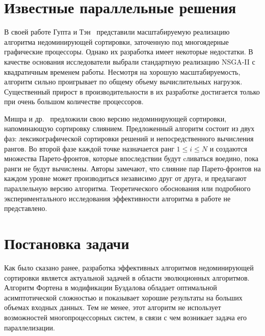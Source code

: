 

\section{Известные параллельные решения}
В своей работе Гупта и Тэн~\cite{gupta15} представили масштабируемую реализацию алгоритма недоминирующей сортировки, заточенную под многоядерные графические процессоры.
Однако их разработка имеет некоторые недостатки. В качестве основания исследователи выбрали стандартную реализацию NSGA-II с квадратичным временем работы.
Несмотря на хорошую масштабируемость, алгоритм сильно проигрывает по общему объему вычислительных нагрузок.
Существенный прирост в производительности в их разработке достигается только при очень большом количестве процессоров. 

Мишра и др.~\cite{mishra16} предложили свою версию недоминирующей сортировки, напоминающую сортировку слиянием.
Предложенный алгоритм состоит из двух фаз: лексикографической сортировки решений и непосредственного вычисления рангов.
Во второй фазе каждой точке назначается ранг $1\leq i \leq N$ и создаются множества Парето-фронтов, которые впоследствии будут cливаться воедино, пока ранги не будут вычислены.
Авторы замечают, что слияние пар Парето-фронтов на каждом уровне может производиться независимо друг от друга, и предлагают параллельную версию алгоритма.
Теоретического обоснования или подробного экспериментального исследования эффективности алгоритма в работе не представлено.

\section{Постановка задачи}
Как было сказано ранее, разработка эффективных алгоритмов недоминирующей сортировки является актуальной задачей в области эволюционных алгоритмов.
Алгоритм Фортена в модификации Буздалова обладает оптимальной асимптотической сложностью и показывает хорошие результаты на больших объемах входных данных.
Тем не менее, этот алгоритм не использует возможностей многопроцессорных систем, в связи с чем возникает задача его параллелизации.
